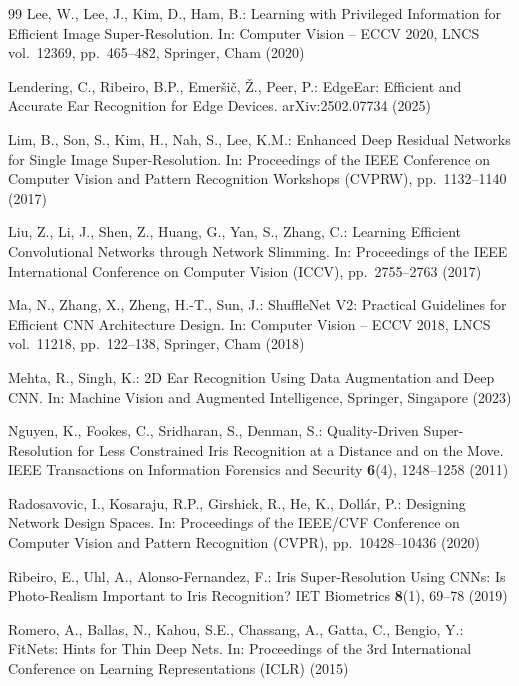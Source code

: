 \documentclass[11pt]{article}
\begin{document}
\begin{thebibliography}{99}
Lee, W., Lee, J., Kim, D., Ham, B.:
Learning with Privileged Information for Efficient Image Super-Resolution.
In: Computer Vision -- ECCV 2020, LNCS vol.\ 12369, pp.\ 465--482, Springer, Cham (2020)

Lendering, C., Ribeiro, B.P., Emeršič, Ž., Peer, P.:
EdgeEar: Efficient and Accurate Ear Recognition for Edge Devices.
arXiv:2502.07734 (2025)

Lim, B., Son, S., Kim, H., Nah, S., Lee, K.M.:
Enhanced Deep Residual Networks for Single Image Super-Resolution.
In: Proceedings of the IEEE Conference on Computer Vision and Pattern Recognition Workshops (CVPRW), pp.\ 1132--1140 (2017)

Liu, Z., Li, J., Shen, Z., Huang, G., Yan, S., Zhang, C.:
Learning Efficient Convolutional Networks through Network Slimming.
In: Proceedings of the IEEE International Conference on Computer Vision (ICCV), pp.\ 2755--2763 (2017)

Ma, N., Zhang, X., Zheng, H.-T., Sun, J.:
ShuffleNet V2: Practical Guidelines for Efficient CNN Architecture Design.
In: Computer Vision -- ECCV 2018, LNCS vol.\ 11218, pp.\ 122--138, Springer, Cham (2018)

Mehta, R., Singh, K.:
2D Ear Recognition Using Data Augmentation and Deep CNN.
In: Machine Vision and Augmented Intelligence, Springer, Singapore (2023)

Nguyen, K., Fookes, C., Sridharan, S., Denman, S.:
Quality-Driven Super-Resolution for Less Constrained Iris Recognition at a Distance and on the Move.
IEEE Transactions on Information Forensics and Security \textbf{6}(4), 1248--1258 (2011)

Radosavovic, I., Kosaraju, R.P., Girshick, R., He, K., Doll\'ar, P.:
Designing Network Design Spaces.
In: Proceedings of the IEEE/CVF Conference on Computer Vision and Pattern Recognition (CVPR), pp.\ 10428--10436 (2020)

Ribeiro, E., Uhl, A., Alonso-Fernandez, F.:
Iris Super-Resolution Using CNNs: Is Photo-Realism Important to Iris Recognition?
IET Biometrics \textbf{8}(1), 69--78 (2019)

Romero, A., Ballas, N., Kahou, S.E., Chassang, A., Gatta, C., Bengio, Y.:
FitNets: Hints for Thin Deep Nets.
In: Proceedings of the 3rd International Conference on Learning Representations (ICLR) (2015)


\end{thebibliography}
\end{document}
